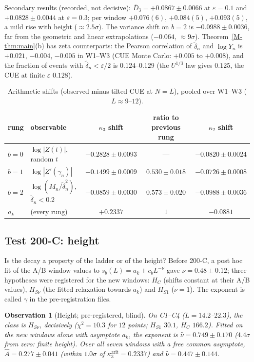 \documentclass[12pt]{amsart}
\newtheorem{observation}{Observation}
\theoremstyle{remark}
\newcommand{\eps}{\varepsilon}
\newcommand{\1}{\mathbf{1}}
\begin{document}
Secondary results (recorded, not decisive): $\bar D_3=+0.0867\pm0.0066$ at
$\eps=0.1$ and $+0.0828\pm0.0044$ at $\eps=0.3$; per window $+0.076(6)$,
$+0.084(5)$, $+0.093(5)$, a mild rise with height ($\approx2.5\sigma$). The
variance shift on $b=2$ is $-0.0988\pm0.0036$, far from the geometric and
linear extrapolations ($-0.064$, $\approx9\sigma$).
Theorem~\ref{M-thm:main}(b) has zeta counterparts: the Pearson correlation
of $\tilde\delta_n$ and $\log Y_n$ is $+0.021$, $-0.004$, $-0.005$ in
W1--W3 (CUE Monte Carlo: $+0.005$ to $+0.008$), and the fraction of events
with $\tilde\delta_n<\eps/2$ is $0.124$--$0.129$ (the $U^{1/3}$ law gives
$0.125$, the CUE at finite $\eps$ $0.128$).

\begin{table}[h]
\centering
\small
\begin{tabular}{llccc}
\toprule
rung & observable & $\kappa_3$ shift & ratio to previous rung & $\kappa_2$ shift\\
\midrule
$b=0$ & $\log|Z(t)|$, random $t$ & $+0.2828\pm0.0093$ & --- & $-0.0820\pm0.0024$\\
$b=1$ & $\log|Z'(\gamma_n)|$ & $+0.1499\pm0.0009$ & $0.530\pm0.018$ & $-0.0726\pm0.0008$\\
$b=2$ & $\log(M_n/\tilde\delta_n^2)$, $\tilde\delta_n<0.2$ & $+0.0859\pm0.0030$ & $0.573\pm0.020$ & $-0.0988\pm0.0036$\\
\midrule
$a_k$ & (every rung) & $+0.2337$ & $1$ & $-0.0881$\\
\bottomrule
\end{tabular}
\caption{\label{tab:ladder}Arithmetic shifts (observed minus tilted CUE at
$N=\bar L$), pooled over W1--W3 ($L\approx9$--$12$).}
\end{table}

\subsection*{Test 200-C: height}
Is the decay a property of the ladder or of the height? Before 200-C, a
post hoc fit of the A/B window values to $s_b(L)=a_k+c_bL^{-\nu}$ gave
$\nu=0.48\pm0.12$; three hypotheses were registered for the new windows:
$H_C$ (shifts constant at their A/B values), $H_{S\nu}$ (the fitted
relaxation towards $a_k$) and $H_{S1}$ ($\nu=1$). The exponent is called
$\gamma$ in the pre-registration files.

\begin{observation}[Height; pre-registered, blind]\label{obs:C}
On C1--C4 ($L=14.2$--$22.3$), the class is $H_{S\nu}$, decisively
($\chi^2=10.3$ for $12$ points; $H_{S1}$ $30.1$, $H_C$ $166.2$). Fitted on
the new windows alone with asymptote $a_k$, the exponent is
$\hat\nu=0.749\pm0.170$ ($4.4\sigma$ from zero: finite height). Over all
seven windows with a free common asymptote, $\hat A=0.277\pm0.041$
(within $1.0\sigma$ of $\kappa_3^{\mathrm{arit}}=0.2337$) and
$\hat\nu=0.447\pm0.144$.
\end{observation}
\end{document}
